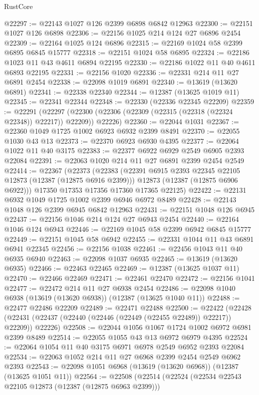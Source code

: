\begin{lexlean}{RustCore}
\begin{coremodule}
@22297 := @22143 @1027 @126 @2399 @6898 @6842 @12963
@22300 := @22151 @1027 @126 @6898
@22306 := @22156 @1025 @214 @124 @27 @6896 @2454
@22309 := @22164 @1025 @124 @6896
@22315 := @22169 @1024 @58 @2399 @6895 @6845 @15777
@22318 := @22151 @1024 @58 @6895
@22324 := @22186 @1023 @11 @43 @4611 @6894 @22195
@22330 := @22186 @1022 @11 @40 @4611 @6893 @22195
@22331 := @22156 @1020
@22336 := @22331 @214 @11 @27 @6891 @2454
@22338 := @22098 @1019 @6891
@22340 := @13619 (@13620 @6891)
@22341 := @22338 @22340
@22344 := @12387 (@13625 @1019 @11)
@22345 := @22341 @22344
@22348 := @22330 (@22336 @22345 @22209)
@22359 := @22291
    (@22297 (@22300 (@22306 (@22309 (@22315 (@22318 (@22324 @22348)) @22217)) @22209)) @22226)
@22360 := @22044 @1031
@22367 := @22360 @1049 @1725 @1002 @6923 @6932 @2399 @8491
@22370 := @22055 @1030 @43 @13
@22373 := @22370 @6923 @6930 @4395
@22377 := @22064 @1022 @11 @40 @3175
@22383 := @22377 @6922 @6929 @2549 @6905 @2393 @22084
@22391 := @22063 @1020 @214 @11 @27 @6891 @2399 @2454 @2549
@22414 := @22367
    (@22373
      (@22383
        (@22391 @6915 @2393 @22345 @22105 @12873 (@12387 (@12875 @6916 @2399)))
        @12873
        (@12387 (@12875 @6906 @6922)))
      @17350
      @17353
      @17356
      @17360
      @17365
      @22125)
@22422 := @22131 @6932 @1049 @1725 @1002 @2399 @6946 @6972 @8489
@22428 := @22143 @1048 @126 @2399 @6945 @6842 @12963
@22431 := @22151 @1048 @126 @6945
@22437 := @22156 @1046 @214 @124 @27 @6943 @2454
@22440 := @22164 @1046 @124 @6943
@22446 := @22169 @1045 @58 @2399 @6942 @6845 @15777
@22449 := @22151 @1045 @58 @6942
@22455 := @22331 @1044 @11 @43 @6891 @6941 @22345
@22456 := @22156 @1038
@22461 := @22456 @1043 @11 @40 @6935 @6940
@22463 := @22098 @1037 @6935
@22465 := @13619 (@13620 @6935)
@22466 := @22463 @22465
@22469 := @12387 (@13625 @1037 @11)
@22470 := @22466 @22469
@22471 := @22461 @22470
@22472 := @22156 @1041
@22477 := @22472 @214 @11 @27 @6938 @2454
@22486 := @22098 @1040 @6938 (@13619 (@13620 @6938)) (@12387 (@13625 @1040 @11))
@22488 := @22477 @22486 @22209
@22489 := @22471 @22488
@22500 := @22422
    (@22428 (@22431 (@22437 (@22440 (@22446 (@22449 (@22455 @22489)) @22217)) @22209)) @22226)
@22508 := @22044 @1056 @1067 @1724 @1002 @6972 @6981 @2399 @8489
@22514 := @22055 @1055 @43 @13 @6972 @6979 @4395
@22524 := @22064 @1054 @11 @40 @3175 @6971 @6978 @2549 @6952 @2393 @22084
@22534 := @22063 @1052 @214 @11 @27 @6968 @2399 @2454 @2549 @6962 @2393
@22543 := @22098 @1051 @6968 (@13619 (@13620 @6968)) (@12387 (@13625 @1051 @11))
@22564 := @22508
    (@22514
      (@22524
        (@22534 @22543 @22105 @12873 (@12387 (@12875 @6963 @2399)))

\end{coremodule}
\end{lexlean}
